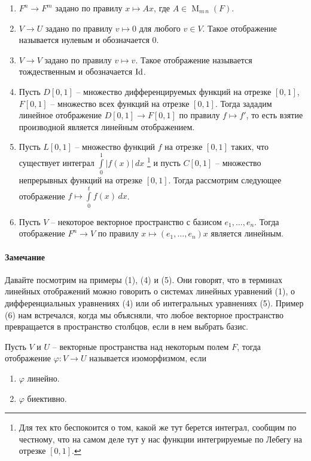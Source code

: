 \begin{enumerate}
\item $F^n \to F^m$ задано по правилу $x\mapsto Ax$, где $A\in \operatorname{M}_{m\,n}(F)$.

\item $V\to U$ задано по правилу $v\mapsto 0$ для любого $v\in V$.
Такое отображение называется нулевым и обозначается $0$.

\item $V\to V$ задано по правилу $v\mapsto v$.
Такое отображение называется тождественным и обозначается $\operatorname{Id}$.

\item Пусть $D[0,1]$ -- множество дифференцируемых функций на отрезке $[0,1]$, $F[0,1]$ -- множество всех функций на отрезке $[0,1]$.
Тогда зададим линейное отображение $D[0,1]\to F[0,1]$ по правилу $f\mapsto f'$, то есть взятие производной является линейным отображением.

\item Пусть $L[0,1]$ -- множество функций $f$ на отрезке $[0,1]$ таких, что существует интеграл $\int\limits_0^1 |f(x)|\,dx$%
\footnote{Для тех кто беспокоится о том, какой же тут берется интеграл, сообщим по честному, что на самом деле тут у нас функции интегрируемые по Лебегу на отрезке $[0,1]$.}
и пусть $C[0,1]$ -- множество непрерывных функций на отрезке $[0,1]$.
Тогда рассмотрим следующее отображение $f\mapsto \int\limits_0^t f(x)\,dx$.

\item Пусть $V$ -- некоторое векторное пространство с базисом $e_1,\ldots, e_n$.
Тогда отображение $F^n \to V$ по правилу $x \mapsto (e_1,\ldots,e_n)x$ является линейным.
\end{enumerate}

\paragraph{Замечание}

Давайте посмотрим на примеры (1), (4) и (5).
Они говорят, что в терминах линейных отображений можно говорить о системах линейных уравнений (1), о дифференциальных уравнениях (4) или об интегральных уравнениях (5).
Пример (6) нам встречался, когда мы объясняли, что любое векторное пространство превращается в пространство столбцов, если в нем выбрать базис.


\begin{definition}
Пусть $V$ и $U$ -- векторные пространства над некоторым полем $F$, тогда отображение $\varphi\colon V\to U$ называется изоморфизмом, если 
\begin{enumerate}
\item $\varphi$ линейно.

\item $\varphi$ биективно.
\end{enumerate}
\end{definition}

